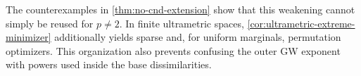 \documentclass[11pt,a4paper]{article}
\theoremstyle{definition}
\theoremstyle{remark}
\begin{document}
The counterexamples in \cref{thm:no-cnd-extension} show that this weakening
cannot simply be reused for \(p\neq2\).  In finite ultrametric spaces,
\cref{cor:ultrametric-extreme-minimizer} additionally yields sparse and, for
uniform marginals, permutation optimizers.  This organization also prevents
confusing the outer GW exponent with powers used inside the base
dissimilarities.



\end{document}
